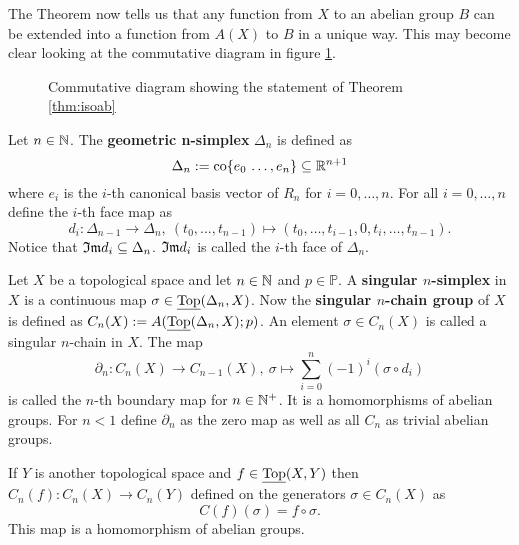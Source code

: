 The Theorem now tells us that any function from $X$ to an abelian group $B$ can be extended into a function from $A(X)$ to $B$ in a unique way. This may become clear looking at the commutative diagram in figure \ref{fig:com1}.

\begin{figure}[h!]
  \centering
  \caption{Commutative diagram showing the statement of Theorem \ref{thm:isoab}}\label{fig:com1}
\end{figure}

\begin{defin}
  Let $n\in\mathbb{N}$. The \textbf{geometric n-simplex} $\Delta_n$ is defined as
  \begin{equation*}
    \Delta_n := {\rm co}\{e_0\, \ldots, e_n\} \subseteq \mathbb{R}^{n+1}
  \end{equation*}
  where $e_i$ is the $i$-th canonical basis vector of $R_n$ for $i = 0,\ldots,n$. For all $i = 0, \ldots, n$ define the $i$-th face map as
  \begin{equation*}
    d_i\colon \Delta_{n-1} \to \Delta_n,\: (t_0,\ldots,t_{n-1}) \mapsto (t_0, \ldots, t_{i-1}, 0, t_i, \ldots, t_{n-1}).
  \end{equation*}
  Notice that $\mathfrak{Im} d_i \subseteq \Delta_n$. $\mathfrak{Im} d_i$ is called the $i$-th face of $\Delta_n$.
\end{defin}

\begin{defin}
  Let $X$ be a topological space and let $n\in \mathbb{N}$ and $p \in \mathbb{P}$. A \textbf{singular $n$-simplex} in $X$ is a continuous map $\sigma \in \underline{\rm Top}(\Delta_n, X)$.
  Now the \textbf{singular $n$-chain group} of $X$ is defined as $C_n(X) := A(\underline{\rm Top}(\Delta_n, X); p)$. An element $\sigma \in C_n(X)$ is called a singular $n$-chain in $X$.
  The map \[\partial_n\colon C_n(X) \to C_{n-1}(X),\: \sigma \mapsto \sum\limits_{i=0}^n(-1)^i(\sigma \circ d_i)\] is called the $n$-th boundary map for $n\in\mathbb{N}^+$. It is a homomorphisms of abelian groups. For $n < 1$ define $\partial_n$ as the zero map as well as all $C_n$ as trivial abelian groups.

  If $Y$ is another topological space and $f \in \underline{\rm Top}(X, Y)$ then $C_n(f)\colon C_n(X) \to C_n(Y)$ defined on the generators $\sigma \in C_n(X)$ as
  \begin{equation*}
    C(f)(\sigma) = f \circ \sigma.
  \end{equation*}
  This map is a homomorphism of abelian groups.
\end{defin}

